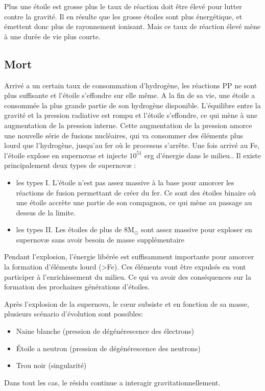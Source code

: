 Plus une étoile est grosse plus le taux de réaction doit être élevé pour lutter contre la gravité.
Il en résulte que les grosse étoiles sont plus énergétique, et émettent donc plus de rayonnement ionisant.
Mais ce taux de réaction élevé mène à une durée de vie plus courte.


\subsection{Mort}

Arrivé a un certain taux de consommation d'hydrogène, les réactions PP ne sont plus suffisante et l'étoile s'effondre sur elle même.
A la fin de sa vie, une étoile a consommée la plus grande partie de son hydrogène disponible.
L'équilibre entre la gravité et la pression radiative est rompu et l'étoile s'effondre, ce qui mène à une augmentation de la pression interne.
Cette augmentation de la pression amorce une nouvelle série de fusions nucléaires, qui va consommer des éléments plus lourd que l’hydrogène, jusqu'au fer où le processus s'arrête.
Une fois arrivé au Fe, l'étoile explose en supernovae et injecte $10^{51}$ erg d'énergie dans le milieu..
Il existe principalement deux types de supernovæ : 
\begin{itemize}
\item les types I.
L'étoile n'est pas assez massive à la base pour amorcer les réactions de fusion permettant de  créer du fer.
Ce sont des étoiles binaire où une étoile accrète une partie de son compagnon, ce qui mène au passage au dessus de la limite.
\item les types II.
Les étoiles de plus de 8M$_\odot$  sont assez massive pour exploser en supernovæ sans avoir besoin de masse supplémentaire
\end{itemize}

Pendant l'explosion, l'énergie libérée est suffisamment importante pour amorcer la formation d'éléments lourd (>Fe).
Ces éléments vont être expulsés en vont participer à l'enrichissement du milieu.
Ce qui va avoir des conséquences sur la formation des prochaines générations d'étoiles.

Après l'explosion de la supernova, le cœur subsiste et en fonction de sa masse, plusieurs scénario d'évolution sont possibles:
\begin{itemize}
\item Naine blanche (pression de dégénérescence des électrons)
\item Étoile a neutron (pression de dégénérescence des neutrons)
\item Trou noir (singularité)
\end{itemize}
Dans tout les cas, le résidu continue a interagir gravitationnellement.


